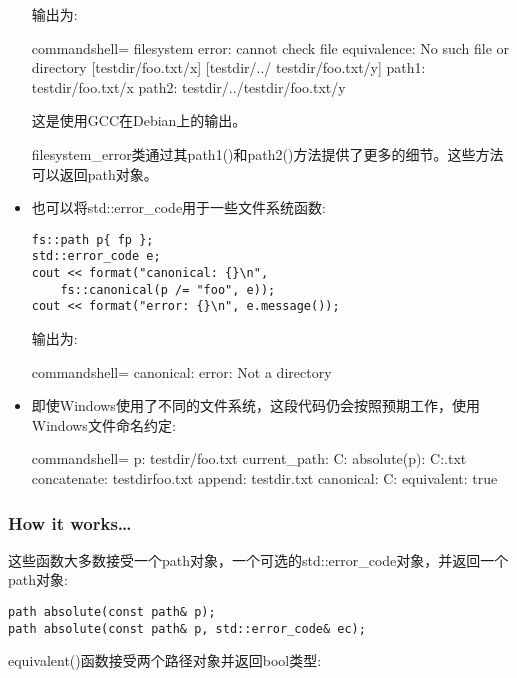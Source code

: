 \begin{itemize}
输出为:

\begin{tcblisting}{commandshell={}}
filesystem error: cannot check file equivalence: No
such file or directory [testdir/foo.txt/x] [testdir/../
testdir/foo.txt/y]
path1: testdir/foo.txt/x
path2: testdir/../testdir/foo.txt/y
\end{tcblisting}

这是使用GCC在Debian上的输出。

filesystem\_error类通过其path1()和path2()方法提供了更多的细节。这些方法可以返回path对象。

\item 
也可以将std::error\_code用于一些文件系统函数:

\begin{lstlisting}[style=styleCXX]
fs::path p{ fp };
std::error_code e;
cout << format("canonical: {}\n",
	fs::canonical(p /= "foo", e));
cout << format("error: {}\n", e.message());
\end{lstlisting}

输出为:

\begin{tcblisting}{commandshell={}}
canonical:
error: Not a directory
\end{tcblisting}

\item 
即使Windows使用了不同的文件系统，这段代码仍会按照预期工作，使用Windows文件命名约定:

\begin{tcblisting}{commandshell={}}
p: testdir/foo.txt
current_path: C:\Users\billw{}
absolute(p): C:\Users\billw{}\testdir\foo.txt
concatenate: testdirfoo.txt
append: testdir\foo.txt
canonical: C:\Users\billw{}\testdir
equivalent: true
\end{tcblisting}
\end{itemize}

\subsubsection{How it works…}

这些函数大多数接受一个path对象，一个可选的std::error\_code对象，并返回一个path对象:

\begin{lstlisting}[style=styleCXX]
path absolute(const path& p);
path absolute(const path& p, std::error_code& ec);
\end{lstlisting}

equivalent()函数接受两个路径对象并返回bool类型:

